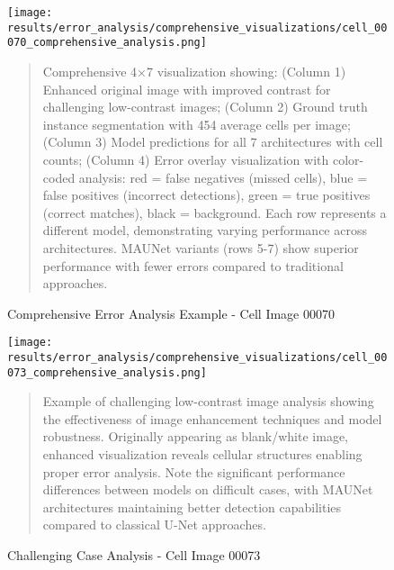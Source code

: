 \begin{figure}[htbp]
\centering
\texttt{[image: results/error\_analysis/comprehensive\_visualizations/cell\_00070\_comprehensive\_analysis.png]}
\caption{Comprehensive Error Analysis Example - Cell Image 00070}
\label{fig:comprehensive_analysis_example}
\begin{quote}
\small
Comprehensive 4×7 visualization showing: (Column 1) Enhanced original image with improved contrast for challenging low-contrast images; (Column 2) Ground truth instance segmentation with 454 average cells per image; (Column 3) Model predictions for all 7 architectures with cell counts; (Column 4) Error overlay visualization with color-coded analysis: red = false negatives (missed cells), blue = false positives (incorrect detections), green = true positives (correct matches), black = background. Each row represents a different model, demonstrating varying performance across architectures. MAUNet variants (rows 5-7) show superior performance with fewer errors compared to traditional approaches.
\end{quote}
\end{figure}

\begin{figure}[htbp]
\centering
\texttt{[image: results/error\_analysis/comprehensive\_visualizations/cell\_00073\_comprehensive\_analysis.png]}
\caption{Challenging Case Analysis - Cell Image 00073}
\label{fig:challenging_case_analysis}
\begin{quote}
\small
Example of challenging low-contrast image analysis showing the effectiveness of image enhancement techniques and model robustness. Originally appearing as blank/white image, enhanced visualization reveals cellular structures enabling proper error analysis. Note the significant performance differences between models on difficult cases, with MAUNet architectures maintaining better detection capabilities compared to classical U-Net approaches.
\end{quote}
\end{figure}
